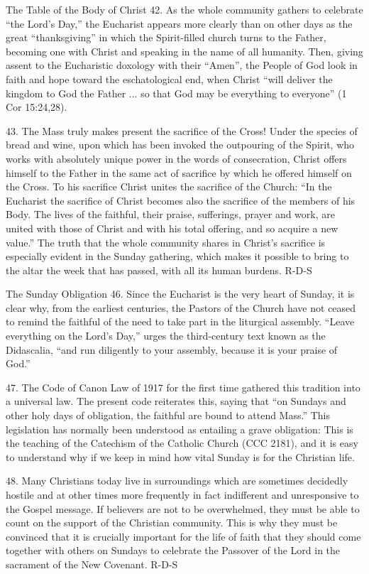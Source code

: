\documentclass[oneside]{book}
\begin{document}
The Table of the Body of Christ
42. As the whole community gathers to celebrate ``the Lord's Day,'' the
Eucharist appears more clearly than on other days as the great ``thanksgiving''
in which the Spirit-filled church turns to the Father, becoming one with Christ
and speaking in the name of all humanity. Then, giving assent to the Eucharistic
doxology with their ``Amen'', the People of God look in faith and hope toward
the eschatological end, when Christ ``will deliver the kingdom to God the Father
... so that God may be everything to everyone'' (1 Cor 15:24,28).

43. The Mass truly makes present the sacrifice of the Cross! Under the species
of bread and wine, upon which has been invoked the outpouring of the Spirit, who
works with absolutely unique power in the words of consecration, Christ offers
himself to the Father in the same act of sacrifice by which he offered himself
on the Cross. To his sacrifice Christ unites the sacrifice of the Church: ``In
the Eucharist the sacrifice of Christ becomes also the sacrifice of the members
of his Body. The lives of the faithful, their praise, sufferings, prayer and
work, are united with those of Christ and with his total offering, and so
acquire a new value.'' The truth that the whole community shares in Christ's
sacrifice is especially evident in the Sunday gathering, which makes it possible
to bring to the altar the week that has passed, with all its human burdens.
R-D-S

The Sunday Obligation
46. Since the Eucharist is the very heart of Sunday, it is clear why, from the
earliest centuries, the Pastors of the Church have not ceased to remind the
faithful of the need to take part in the liturgical assembly. ``Leave everything
on the Lord's Day,'' urges the third-century text known as the Didascalia, ``and
run diligently to your assembly, because it is your praise of God.''

47. The Code of Canon Law of 1917 for the first time gathered this tradition
into a universal law. The present code reiterates this, saying that ``on Sundays
and other holy days of obligation, the faithful are bound to attend Mass.'' This
legislation has normally been understood as entailing a grave obligation: This
is the teaching of the Catechism of the Catholic Church (CCC 2181), and it is
easy to understand why if we keep in mind how vital Sunday is for the Christian
life.

48. Many Christians today live in surroundings which are sometimes decidedly
hostile and at other times  more frequently in fact  indifferent and
unresponsive to the Gospel message. If believers are not to be overwhelmed, they
must be able to count on the support of the Christian community. This is why
they must be convinced that it is crucially important for the life of faith that
they should come together with others on Sundays to celebrate the Passover of
the Lord in the sacrament of the New Covenant.
R-D-S
\end{document}
